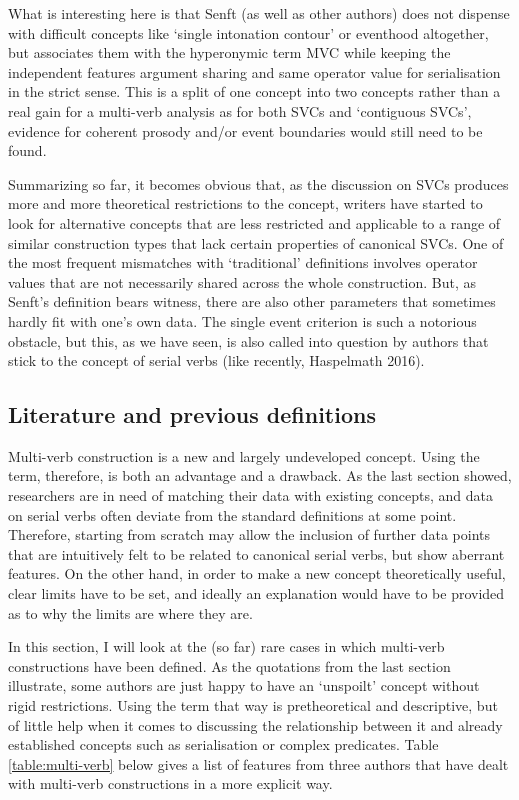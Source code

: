 What is interesting here is that Senft (as well as other authors) does not dispense with difficult concepts like `single intonation contour' or eventhood altogether, but associates them with the hyperonymic term MVC while keeping the independent features argument sharing and same operator value for serialisation in the strict sense. This is a split of one concept into two concepts rather than a real gain for a multi-verb analysis as for both SVCs and `contiguous SVCs', evidence for coherent prosody and/or event boundaries would still need to be found.

Summarizing so far, it becomes obvious that, as the discussion on SVCs produces more and more theoretical restrictions to the concept, writers have started to look for alternative concepts that are less restricted and applicable to a range of similar construction types that lack certain properties of canonical SVCs. One of the most frequent mismatches with `traditional' definitions involves operator values that are not necessarily shared across the whole construction. But, as Senft's definition bears witness, there are also other parameters that sometimes hardly fit with one's own data. The single event criterion is such a notorious obstacle, but this, as we have seen, is also called into question by authors that stick to the concept of serial verbs (like recently, Haspelmath 2016). 

\subsection{Literature and previous definitions} \label{sec:literature-mvcs}

Multi-verb construction is a new and largely undeveloped concept. Using the term, therefore, is both an advantage and a drawback. As the last section showed, researchers are in need of matching their data with existing concepts, and data on serial verbs often deviate from the standard definitions at some point. Therefore, starting from scratch may allow the inclusion of further data points that are intuitively felt to be related to canonical serial verbs, but show aberrant features. On the other hand, in order to make a new concept theoretically useful, clear limits have to be set, and ideally an explanation would have to be provided as to why the limits are where they are. 

In this section, I will look at the (so far) rare cases in which multi-verb constructions have been defined. As the quotations from the last section illustrate, some authors are just happy to have an `unspoilt' concept without rigid restrictions. Using the term that way is pretheoretical and descriptive, but of little help when it comes to discussing the relationship between it and already established concepts such as serialisation or complex predicates. Table \ref{table:multi-verb} below gives a list of features from three authors that have dealt with multi-verb constructions in a more explicit way.

